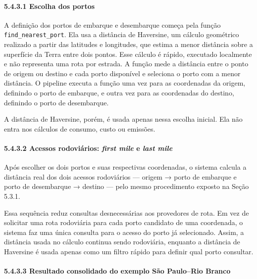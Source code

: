 \documentclass[brazil,]{article}
\let\oldparagraph\paragraph
\renewcommand{\paragraph}[1]{\Needspace{7\baselineskip}\oldparagraph{#1}\mbox{}}
\begin{document}
\hypertarget{escolha-dos-portos-1}{%
\paragraph{5.4.3.1 Escolha dos portos}\label{escolha-dos-portos-1}}

A definição dos portos de embarque e desembarque começa pela função
\texttt{find\_nearest\_port}. Ela usa a distância de Haversine, um
cálculo geométrico realizado a partir das latitudes e longitudes, que
estima a menor distância sobre a superfície da Terra entre dois pontos.
Esse cálculo é rápido, executado localmente e não representa uma rota
por estrada. A função mede a distância entre o ponto de origem ou
destino e cada porto disponível e seleciona o porto com a menor
distância. O pipeline executa a função uma vez para as coordenadas da
origem, definindo o porto de embarque, e outra vez para as coordenadas
do destino, definindo o porto de desembarque.

A distância de Haversine, porém, é usada apenas nessa escolha inicial.
Ela não entra nos cálculos de consumo, custo ou emissões.

\hypertarget{acessos-rodoviuxe1rios-first-mile-e-last-mile-1}{%
\paragraph{\texorpdfstring{5.4.3.2 Acessos rodoviários: \emph{first
mile} e \emph{last
mile}}{5.4.3.2 Acessos rodoviários: first mile e last mile}}\label{acessos-rodoviuxe1rios-first-mile-e-last-mile-1}}

Após escolher os dois portos e suas respectivas coordenadas, o sistema
calcula a distância real dos dois acessos rodoviários --- origem → porto
de embarque e porto de desembarque → destino --- pelo mesmo procedimento
exposto na Seção 5.3.1.

Essa sequência reduz consultas desnecessárias aos provedores de rota. Em
vez de solicitar uma rota rodoviária para cada porto candidato de uma
coordenada, o sistema faz uma única consulta para o acesso do porto já
selecionado. Assim, a distância usada no cálculo continua sendo
rodoviária, enquanto a distância de Haversine é usada apenas como um
filtro rápido para definir qual porto consultar.

\hypertarget{resultado-consolidado-do-exemplo-suxe3o-paulorio-branco}{%
\paragraph{5.4.3.3 Resultado consolidado do exemplo São Paulo--Rio
Branco}\label{resultado-consolidado-do-exemplo-suxe3o-paulorio-branco}}
\end{document}
